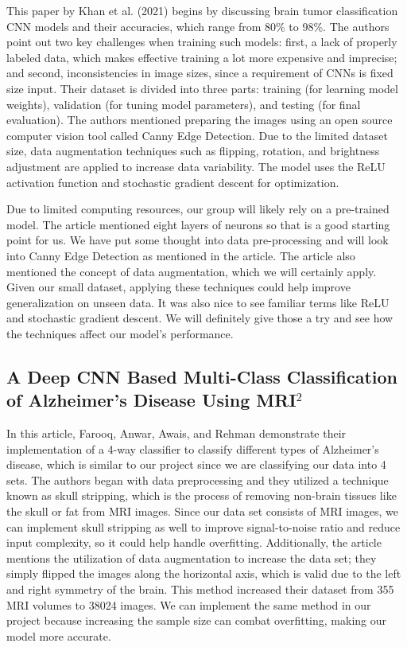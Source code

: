 \documentclass[conference]{IEEEtran}
\begin{document}
This paper by Khan et al. (2021) begins by discussing brain tumor classification CNN models and their accuracies, which range from 80\% to 98\%. The authors point out two key challenges when training such models: first, a lack of properly labeled data, which makes effective training a lot more expensive and imprecise; and second, inconsistencies in image sizes, since a requirement of CNNs is fixed size input. Their dataset is divided into three parts: training (for learning model weights), validation (for tuning model parameters), and testing (for final evaluation). The authors mentioned preparing the images using an open source computer vision tool called Canny Edge Detection. Due to the limited dataset size, data augmentation techniques such as flipping, rotation, and brightness adjustment are applied to increase data variability. The model uses the ReLU activation function and stochastic gradient descent for optimization.

Due to limited computing resources, our group will likely rely on a pre-trained model. The article mentioned eight layers of neurons so that is a good starting point for us. We have put some thought into data pre-processing and will look into Canny Edge Detection as mentioned in the article. The article also mentioned the concept of data augmentation, which we will certainly apply. Given our small dataset, applying these techniques could help improve generalization on unseen data. It was also nice to see familiar terms like ReLU and stochastic gradient descent. We will definitely give those a try and see how the techniques affect our model's performance.

\subsection{\large A Deep CNN Based Multi-Class Classification of Alzheimer's Disease Using MRI$^{2}$}

In this article, Farooq, Anwar, Awais, and Rehman demonstrate their implementation of a 4-way classifier to classify different types of Alzheimer's disease, which is similar to our project since we are classifying our data into 4 sets. The authors began with data preprocessing and they utilized a technique known as skull stripping, which is the process of removing non-brain tissues like the skull or fat from MRI images. Since our data set consists of MRI images, we can implement skull stripping as well to improve signal-to-noise ratio and reduce input complexity, so it could help handle overfitting. Additionally, the article mentions the utilization of data augmentation to increase the data set; they simply flipped the images along the horizontal axis, which is valid due to the left and right symmetry of the brain. This method increased their dataset from 355 MRI volumes to 38024 images. We can implement the same method in our project because increasing the sample size can combat overfitting, making our model more accurate.
\end{document}
